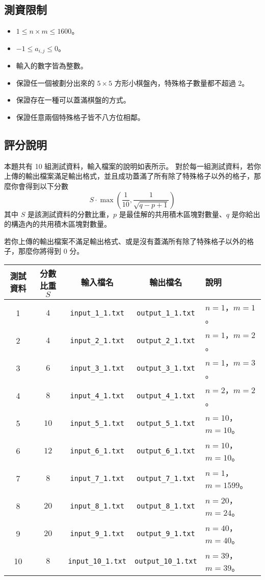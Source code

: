 \subsection{測資限制}

\begin{itemize}
\tightlist
\item
  \(1\le n\times m\le 1600\)。
\item
  \(-1 \leq a_{i, j} \leq 0\)。
\item
  輸入的數字皆為整數。
\item
  保證任一個被劃分出來的 \(5\times 5\)
  方形小棋盤內，特殊格子數量都不超過 \(2\)。
\item
  保證存在一種可以蓋滿棋盤的方式。
\item
  保證任意兩個特殊格子皆不八方位相鄰。
\end{itemize}

\subsection{評分說明}

本題共有 10 組測試資料，輸入檔案的說明如表所示。
對於每一組測試資料，若你上傳的輸出檔案滿足輸出格式，並且成功蓋滿了所有除了特殊格子以外的格子，那麼你會得到以下分數
\[
S \cdot \max\left(\frac{1}{10}, \frac{1}{\sqrt{q - p + 1}}\right) 
\] 其中 \(S\) 是該測試資料的分數比重，\(p\)
是最佳解的共用積木區塊對數量、\(q\)
是你給出的構造內的共用積木區塊對數量。

若你上傳的輸出檔案不滿足輸出格式、或是沒有蓋滿所有除了特殊格子以外的格子，那麼你將得到
\(0\) 分。

\begin{longtable}[]{@{}ccccl@{}}
\toprule
測試資料 & 分數比重 \(S\) & 輸入檔名 & 輸出檔名 & 說明 \\
\midrule
\endhead
1 & \(4\) & \texttt{input\_1\_1.txt} & \texttt{output\_1\_1.txt} &
\(n = 1\)，\(m = 1\)。 \\
2 & \(4\) & \texttt{input\_2\_1.txt} & \texttt{output\_2\_1.txt} &
\(n = 1\)，\(m = 2\)。 \\
3 & \(6\) & \texttt{input\_3\_1.txt} & \texttt{output\_3\_1.txt} &
\(n = 1\)，\(m = 3\)。 \\
4 & \(8\) & \texttt{input\_4\_1.txt} & \texttt{output\_4\_1.txt} &
\(n = 2\)，\(m = 2\)。 \\
5 & \(10\) & \texttt{input\_5\_1.txt} & \texttt{output\_5\_1.txt} &
\(n = 10\)，\(m = 10\)。 \\
6 & \(12\) & \texttt{input\_6\_1.txt} & \texttt{output\_6\_1.txt} &
\(n = 10\)，\(m = 10\)。 \\
7 & \(8\) & \texttt{input\_7\_1.txt} & \texttt{output\_7\_1.txt} &
\(n = 1\)，\(m = 1599\)。 \\
8 & \(20\) & \texttt{input\_8\_1.txt} & \texttt{output\_8\_1.txt} &
\(n = 20\)，\(m = 24\)。 \\
9 & \(20\) & \texttt{input\_9\_1.txt} & \texttt{output\_9\_1.txt} &
\(n = 40\)，\(m = 40\)。 \\
10 & \(8\) & \texttt{input\_10\_1.txt} & \texttt{output\_10\_1.txt} &
\(n = 39\)，\(m = 39\)。 \\
\bottomrule
\end{longtable}

